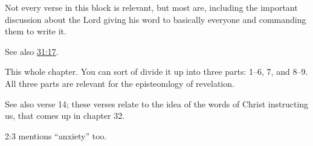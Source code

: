 \begin{compactdesc}
			\item[{\hyperref[2NEPHI-28-27]{2 Nephi 28:27--31}}]
			\item[{\hyperref[2NEPHI-29-3]{2 Nephi 29:3--14}}] \phantom{.}
				\begin{compactitem}
					\item Not every verse in this block is relevant, but most are, including the important discussion about the Lord giving his word to basically everyone and commanding them to write it.
				\end{compactitem}
			\item[{\hyperref[2NEPHI-30-15]{2 Nephi 30:15--18}}]
			\item[{\hyperref[2NEPHI-31-2]{2 Nephi 31:2--3}}]
			\item[{\hyperref[2NEPHI-31-12]{2 Nephi 31:12}}] \phantom{.}
				\begin{compactitem}
					\item See also \hyperref[2NEPHI-31-17]{31:17}.
				\end{compactitem}
			\item[{\hyperref[2NEPHI-31-19]{2 Nephi 31:19--20}}]
			\item[{\hyperref[2NEPHI-32]{2 Nephi 32}}] \phantom{.}
				\begin{compactitem}
					\item This whole chapter. You can sort of divide it up into three parts: 1--6, 7, and 8--9. All three parts are relevant for the episteomlogy of revelation.
				\end{compactitem}
			\item[{\hyperref[2NEPHI-33-1]{2 Nephi 33:1--2}}]
			\item[{\hyperref[2NEPHI-33-10]{2 Nephi 33:10}}] \phantom{.}
				\begin{compactitem}
					\item See also verse 14; these verses relate to the idea of the words of Christ instructing us, that comes up in chapter 32.
				\end{compactitem}
			\item[{\hyperref[JACOB-1-5]{Jacob 1:5--8}}] \phantom{.}
				\begin{compactitem}
					\item 2:3 mentions ``anxiety'' too.
				\end{compactitem}
			\item[{\hyperref[JACOB-2-5]{Jacob 2:5}}]
			\item[{\hyperref[JACOB-3-2]{Jacob 3:2}}]
			\item[{\hyperref[JACOB-4-5]{Jacob 4:5--18}}] \phantom{.}

\end{compactdesc}
